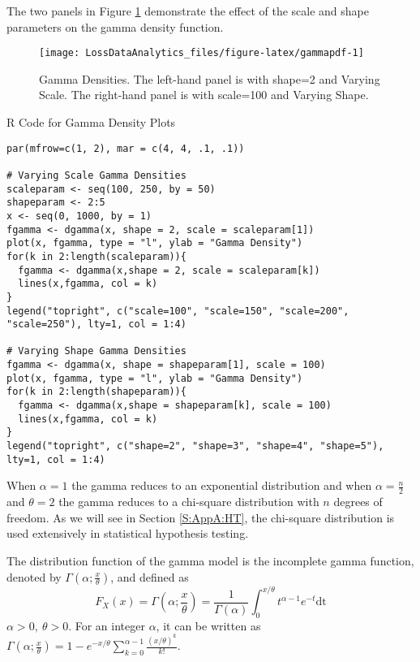 \documentclass[]{book}
\theoremstyle{definition}
\theoremstyle{definition}
\theoremstyle{definition}
\theoremstyle{remark}
\begin{document}
The two panels in Figure \ref{fig:gammapdf} demonstrate the effect of
the scale and shape parameters on the gamma density function.

\begin{figure}

{\centering \texttt{[image: LossDataAnalytics\_files/figure-latex/gammapdf-1]} 

}

\caption{Gamma Densities. The left-hand panel is with shape=2 and Varying Scale. 
 The right-hand panel is with scale=100 and Varying Shape.}\label{fig:gammapdf}
\end{figure}

R Code for Gamma Density Plots

\hypertarget{display.gammascale.2}{}
\begin{verbatim}
par(mfrow=c(1, 2), mar = c(4, 4, .1, .1))

# Varying Scale Gamma Densities
scaleparam <- seq(100, 250, by = 50)
shapeparam <- 2:5
x <- seq(0, 1000, by = 1)
fgamma <- dgamma(x, shape = 2, scale = scaleparam[1])
plot(x, fgamma, type = "l", ylab = "Gamma Density")
for(k in 2:length(scaleparam)){
  fgamma <- dgamma(x,shape = 2, scale = scaleparam[k])
  lines(x,fgamma, col = k)
}
legend("topright", c("scale=100", "scale=150", "scale=200", "scale=250"), lty=1, col = 1:4)

# Varying Shape Gamma Densities
fgamma <- dgamma(x, shape = shapeparam[1], scale = 100)
plot(x, fgamma, type = "l", ylab = "Gamma Density")
for(k in 2:length(shapeparam)){
  fgamma <- dgamma(x,shape = shapeparam[k], scale = 100)
  lines(x,fgamma, col = k)
}
legend("topright", c("shape=2", "shape=3", "shape=4", "shape=5"), lty=1, col = 1:4)
\end{verbatim}

When \(\alpha = 1\) the gamma reduces to an exponential distribution and
when \(\alpha = \frac{n}{2}\) and \(\theta = 2\) the gamma reduces to a
chi-square distribution with \(n\) degrees of freedom. As we will see in
Section \ref{S:AppA:HT}, the chi-square distribution is used extensively
in statistical hypothesis testing.

The distribution function of the gamma model is the incomplete gamma
function, denoted by \(\Gamma\left(\alpha; \frac{x}{\theta} \right)\),
and defined as
\[F_{X}\left( x \right) = \Gamma\left( \alpha; \frac{x}{\theta} \right) = \frac{1}{\Gamma\left( \alpha \right)}\int_{0}^{x /\theta}t^{\alpha - 1}e^{- t}\text{dt}\]
\(\alpha > 0,\ \theta > 0\). For an integer \(\alpha\), it can be
written as
\(\Gamma\left( \alpha; \frac{x}{\theta} \right) = 1 - e^{-x/\theta}\sum_{k = 0}^{\alpha-1}\frac{(x/\theta)^k}{k!}\).
\end{document}

